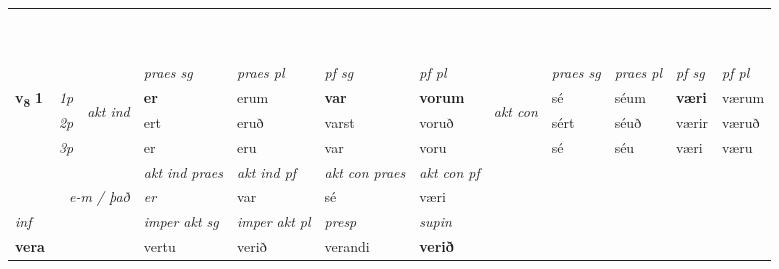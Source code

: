 \begin{longtable}[l]{X>{\footnotesize\itshape}llXXXXlXXXX}
\midrule
& \\*
   & \\*
   & \\*
  & \\*
   & \\*
   & \\*
   & \\*
  & \\*
   & \\*
  & \\
   \midrule
 & &   & \textit{praes sg}  & \textit{praes pl}    & \textit{ pf sg} & \textit{pf pl} & & \textit{praes sg}  & \textit{praes pl}    & \textit{pf sg} & \textit{pf pl }  \\ \cmidrule{4-7} \cmidrule{9-12}
 \multirow{2}{*}{{{\textbf{v{\textsubscript{8}}} \Large{\textbf{1}}}}}  & 1p & \multirow{3}{*}{\begin{turn}{90}\textit{akt ind}\end{turn}} & \textbf{er} & erum & \textbf{var} & \textbf{vorum} & \multirow{3}{*}{\begin{turn}{90}\textit{akt con}\end{turn}} &sé & séum & \textbf{væri} & værum\\*
 & 2p &  &  ert  & eruð & varst & voruð & & sért & séuð & værir & væruð \\*
 & 3p &  & er & eru & var & voru & & sé & séu& væri & væru \\*
\cmidrule{4-7} \cmidrule{9-12}

   && &  \textit{akt ind praes} & \textit{akt ind pf} & \textit{akt con praes} & \textit{akt con pf} \\*
\multicolumn{3}{r}{\textit{e-m / það}} & er & var & sé & væri \\*

\cmidrule{4-7}
   {\textit{inf}} & &  & \textit{imper akt sg} & \textit{imper akt pl}   & \textit{presp} & \textit{supin}   \\*
  {\textbf{vera}} & && vertu  & verið   & verandi &  \textbf{verið}   \\*

\midrule


\end{longtable}
